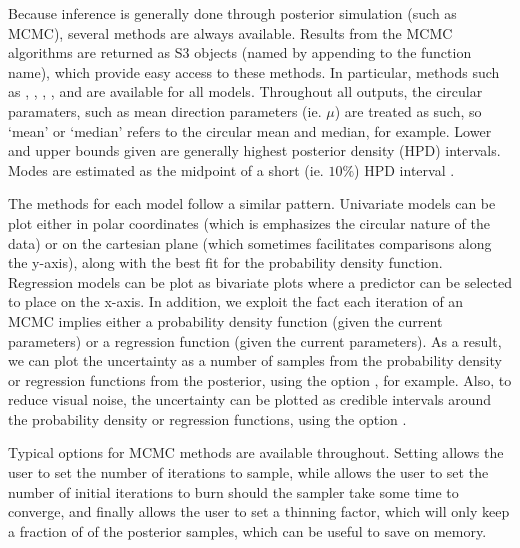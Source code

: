Because inference is generally done through posterior simulation (such
as MCMC), several methods are always available. Results from the MCMC
algorithms are returned as S3 objects (named by appending  to
the function name), which provide easy access to these methods. In
particular, methods such as , ,
, ,  and 
are available for all models. Throughout all outputs, the circular
paramaters, such as mean direction parameters (ie. \(\mu\)) are treated
as such, so `mean' or `median' refers to the circular mean and median,
for example. Lower and upper bounds given are generally highest
posterior density (HPD) intervals. Modes are estimated as the midpoint
of a short (ie. \(10\%\)) HPD interval \citep{venter1967estimation}.

The  methods for each model follow a similar pattern.
Univariate models can be plot either in polar coordinates (which is
emphasizes the circular nature of the data) or on the cartesian plane
(which sometimes facilitates comparisons along the y-axis), along with
the best fit for the probability density function. Regression models can
be plot as bivariate plots where a predictor can be selected to place on
the x-axis. In addition, we exploit the fact each iteration of an MCMC
implies either a probability density function (given the current
parameters) or a regression function (given the current parameters). As
a result, we can plot the uncertainty as a number of samples from the
probability density or regression functions from the posterior, using
the option , for example. Also, to reduce visual
noise, the uncertainty can be plotted as credible intervals around the
probability density or regression functions, using the option
.

Typical options for MCMC methods are available throughout. Setting
 allows the user to set the number of iterations to sample,
while  allows the user to set the number of initial
iterations to burn should the sampler take some time to converge, and
finally  allows the user to set a thinning factor, which will
only keep a fraction of  of the posterior samples, which
can be useful to save on memory.

